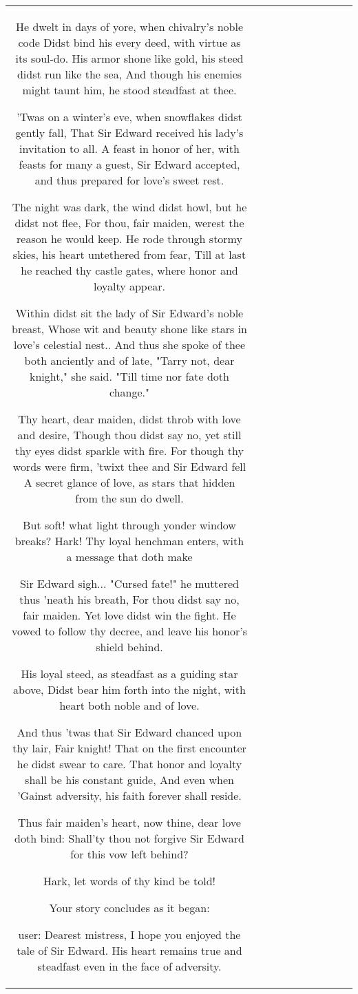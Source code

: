 \begin{table}[h!]
\begin{tabular}{|c|c|c|c|c|c|c|c|c|c|}
He dwelt in days of yore, when chivalry's noble code
Didst bind his every deed, with virtue as its soul-do.
His armor shone like gold, his steed didst run like the sea,
And though his enemies might taunt him, he stood steadfast at thee.

'Twas on a winter's eve, when snowflakes didst gently fall,
That Sir Edward received his lady's invitation to all.
A feast in honor of her, with feasts for many a guest,
Sir Edward accepted, and thus prepared for love's sweet rest.

The night was dark, the wind didst howl, but he didst not flee,
For thou, fair maiden, werest the reason he would keep.
He rode through stormy skies, his heart untethered from fear,
Till at last he reached thy castle gates, where honor and loyalty appear.

Within didst sit the lady of Sir Edward's noble breast,
Whose wit and beauty shone like stars in love's celestial nest..
And thus she spoke of thee both anciently and of late,
"Tarry not, dear knight," she said. "Till time nor fate doth change."

Thy heart, dear maiden, didst throb with love and desire,
Though thou didst say no, yet still thy eyes didst sparkle with fire.
For though thy words were firm, 'twixt thee and Sir Edward fell
A secret glance of love, as stars that hidden from the sun do dwell.

But soft! what light through yonder window breaks? Hark!
Thy loyal henchman enters, with a message that doth make

Sir Edward sigh... "Cursed fate!" he muttered thus 'neath his breath,
For thou didst say no, fair maiden. Yet love didst win the fight.
He vowed to follow thy decree, and leave his honor's shield behind.

His loyal steed, as steadfast as a guiding star above,
Didst bear him forth into the night, with heart both noble and of love.

And thus 'twas that Sir Edward chanced upon thy lair,
Fair knight! That on the first encounter he didst swear to care.
That honor and loyalty shall be his constant guide,
And even when 'Gainst adversity, his faith forever shall reside.

Thus fair maiden's heart, now thine, dear love doth bind:
Shall'ty thou not forgive Sir Edward for this vow left behind?

Hark, let words of thy kind be told!

Your story concludes as it began:

user: 
  Dearest mistress,
  I hope you enjoyed the tale of Sir Edward.
  His heart remains true and steadfast even in the face of adversity.


\end{tabular}
\end{table}
